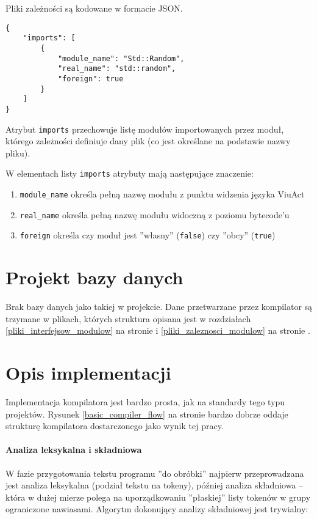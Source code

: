 Pliki zależności są kodowane w formacie JSON.

\begin{lstlisting}
{
    "imports": [
        {
            "module_name": "Std::Random",
            "real_name": "std::random",
            "foreign": true
        }
    ]
}
\end{lstlisting}

Atrybut \texttt{imports} przechowuje listę modułów importowanych przez moduł, którego zależności definiuje
dany plik (co jest określane na podstawie nazwy pliku).

W elementach listy \texttt{imports} atrybuty mają następujące znaczenie:

\begin{enumerate}
    \item \texttt{module\_name} określa pełną nazwę modułu z punktu widzenia języka ViuAct
    \item \texttt{real\_name} określa pełną nazwę modułu widoczną z poziomu bytecode'u
    \item \texttt{foreign} określa czy moduł jest ''własny'' (\texttt{false}) czy ''obcy'' (\texttt{true})
\end{enumerate}

\section{Projekt bazy danych}

Brak bazy danych jako takiej w projekcie.
Dane przetwarzane przez kompilator są trzymane w plikach, których struktura opisana jest w rozdziałach
\ref{pliki_interfejsow_modulow} na stronie \pageref{pliki_interfejsow_modulow} i
\ref{pliki_zaleznosci_modulow} na stronie \pageref{pliki_zaleznosci_modulow}.

\section{Opis implementacji}

Implementacja kompilatora jest bardzo prosta, jak na standardy tego typu projektów.
Rysunek \ref{basic_compiler_flow} na stronie \pageref{basic_compiler_flow} bardzo dobrze oddaje strukturę
kompilatora dostarczonego jako wynik tej pracy.

\paragraph*{Analiza leksykalna i składniowa}
W fazie przygotowania tekstu programu ''do obróbki'' najpierw przeprowadzana jest analiza leksykalna (podział
tekstu na tokeny), później analiza składniowa -- która w dużej mierze polega na uporządkowaniu ''płaskiej''
listy tokenów w grupy ograniczone nawiasami. Algorytm dokonujący analizy składniowej jest trywialny:

